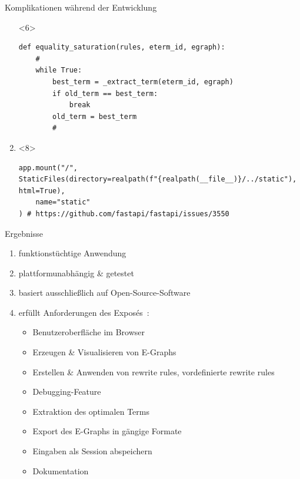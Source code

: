 \begin{frame}[fragile]{Komplikationen während der Entwicklung}
\begin{enumerate}
\begin{onlyenv}<6>
    \vspace{3mm}
    \begin{center}
\begin{verbatim}    
def equality_saturation(rules, eterm_id, egraph):
    #
    while True:
        best_term = _extract_term(eterm_id, egraph)
        if old_term == best_term:
            break
        old_term = best_term
        #  
\end{verbatim}
\end{center}
\end{onlyenv}
        
        \item {}
        
\begin{onlyenv}<8>
    \vspace{3mm}
    \begin{center}
\begin{verbatim}    
app.mount("/", 
StaticFiles(directory=realpath(f"{realpath(__file__)}/../static"), html=True),
    name="static"
) # https://github.com/fastapi/fastapi/issues/3550
\end{verbatim}
\end{center}
\end{onlyenv}

    \end{enumerate}
\end{frame}

\begin{frame}{Ergebnisse}
    \begin{enumerate}
        \item funktionstüchtige Anwendung
        \item plattformunabhängig \& getestet
        \item basiert ausschließlich auf Open-Source-Software
        \item erfüllt Anforderungen des Exposés~\cite{expose}:
        \begin{itemize}
            \color{gray-500}
            \item Benutzeroberfläche im Browser
            \item Erzeugen \& Visualisieren von E-Graphs
            \item Erstellen \& Anwenden von rewrite rules, vordefinierte rewrite rules
            \item Debugging-Feature
            \item Extraktion des optimalen Terms
            \item Export des E-Graphs in gängige Formate
            \item Eingaben als Session abspeichern
            \item Dokumentation
            \color{black}
        \end{itemize}
    \end{enumerate}
\end{frame}

